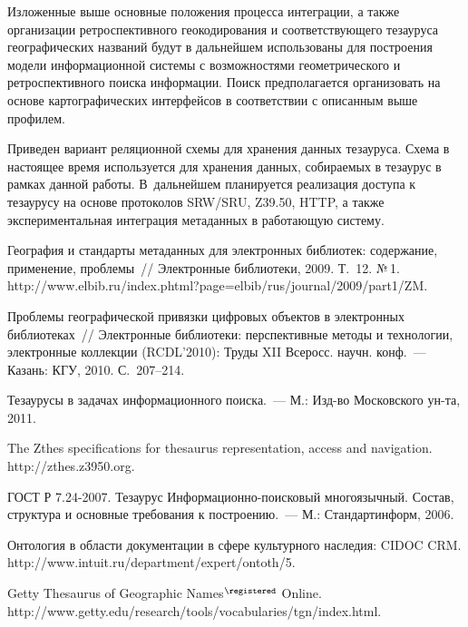 \begin{multicols}{2}
  Изложенные выше основные положения процесса интеграции, а также организации 
ретроспективного геокодирования и соответствующего тезауруса географических названий 
будут в дальнейшем использованы для построения модели информационной системы с 
возможностями геометрического и ретроспективного поиска информации. Поиск 
предполагается организовать на основе картографических интерфейсов в соответствии с 
описанным выше профилем.
  
  Приведен вариант реляционной схемы для хранения данных тезауруса. Схема в настоящее 
время используется для хранения данных, собираемых в тезаурус в рамках данной работы. 
В~дальнейшем планируется реализация доступа к тезаурусу на основе протоколов 
SRW/SRU, Z39.50, {HTTP}, а также экспериментальная интеграция 
метаданных в работающую систему.

{\small\frenchspacing
{%
\begin{thebibliography}{99}
  
География и стандарты метаданных для электронных библиотек: содержание, 
применение, проблемы~// Электронные библиотеки, 2009. Т.~12. №\,1. {\sf 
http://www.elbib.ru/\linebreak index.phtml?page=elbib/rus/journal/2009/part1/\linebreak ZM}.

Проблемы географической привязки цифровых объектов в электронных библиотеках~// 
Электронные библиотеки: перспективные методы и технологии, электронные коллекции 
(RCDL'2010): Труды XII Всеросс. научн. конф.~--- Казань: КГУ, 2010. С.~207--214.

Тезаурусы в задачах информационного поиска.~--- М.: Изд-во Московского ун-та, 2011.

The Zthes specifications for thesaurus representation, access and navigation. {\sf 
http://zthes.z3950.org}.

ГОСТ Р 7.24-2007. Тезаурус Ин\-фор\-ма\-ци\-он\-но-по\-иско\-вый многоязычный. Состав, 
структура и основные требования к построению.~--- М.: Стандартинформ, 2006.

Онтология в области документации в сфере культурного наследия: CIDOC CRM. {\sf 
http://\linebreak www.intuit.ru/department/expert/ontoth/5}.

Getty Thesaurus of Geographic Names$^\registered$ Online. {\sf 
http://\linebreak www.getty.edu/research/tools/vocabularies/tgn/index.\linebreak html}.


\end{thebibliography}}}
\end{multicols}
